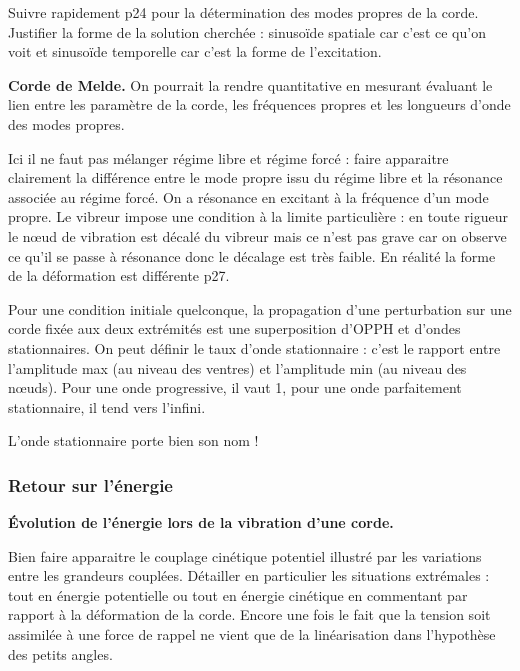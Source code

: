 Suivre rapidement \cite{Thibierge2014} p24 pour la détermination des modes propres de la corde.
Justifier la forme de la solution cherchée : sinusoïde spatiale car c'est ce qu'on voit et sinusoïde temporelle car c'est la forme de l'excitation.

\begin{experience}
\textbf{Corde de Melde.}
On pourrait la rendre quantitative en mesurant évaluant le lien entre les paramètre de la corde, les fréquences propres et les longueurs d'onde des modes propres.
\end{experience}

\begin{remarque}
Ici il ne faut pas mélanger régime libre et régime forcé : faire apparaitre clairement la différence entre le mode propre issu du régime libre et la résonance associée au régime forcé.
On a résonance en excitant à la fréquence d'un mode propre.
Le vibreur impose une condition à la limite particulière : en toute rigueur le nœud de vibration est décalé du vibreur mais ce n'est pas grave car on observe ce qu'il se passe à résonance donc le décalage est très faible.
En réalité la forme de la déformation est différente \cite{Thibierge2014} p27.

\noindent
Pour une condition initiale quelconque, la propagation d'une perturbation sur une corde fixée aux deux extrémités est une superposition d'OPPH et d'ondes stationnaires.
On peut définir le taux d'onde stationnaire : c'est le rapport entre l'amplitude max (au niveau des ventres) et l'amplitude min (au niveau des nœuds).
Pour une onde progressive, il vaut 1, pour une onde parfaitement stationnaire, il tend vers l'infini.
\end{remarque}

\begin{transition}
L'onde stationnaire porte bien son nom !
\end{transition}

\subsubsection{Retour sur l'énergie}

\begin{slide}
\textbf{Évolution de l'énergie lors de la vibration d'une corde.}
\end{slide}

Bien faire apparaitre le couplage cinétique potentiel illustré par les variations entre les grandeurs couplées.
Détailler en particulier les situations extrémales : tout en énergie potentielle ou tout en énergie cinétique en commentant par rapport à la déformation de la corde.
Encore une fois le fait que la tension soit assimilée à une force de rappel ne vient que de la linéarisation dans l'hypothèse des petits angles.

